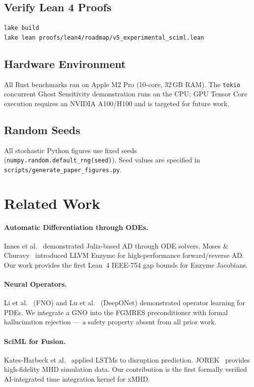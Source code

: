 \documentclass[11pt,twocolumn]{article}
\begin{document}
\subsection{Verify Lean 4 Proofs}
\begin{verbatim}
lake build
lake lean proofs/lean4/roadmap/v5_experimental_sciml.lean
\end{verbatim}

\subsection{Hardware Environment}
All Rust benchmarks ran on Apple M2 Pro (10-core, 32\,GB RAM).
The \texttt{tokio} concurrent Ghost Sensitivity demonstration runs
on the CPU; GPU Tensor Core execution requires an NVIDIA A100/H100
and is targeted for future work.

\subsection{Random Seeds}
All stochastic Python figures use fixed seeds (\texttt{numpy.random.default\_rng(seed)}).
Seed values are specified in \texttt{scripts/generate\_paper\_figures.py}.

\section{Related Work}

\paragraph{Automatic Differentiation through ODEs.}
Innes et al.~\cite{innes2019} demonstrated Julia-based AD through ODE
solvers. Moses \& Churavy~\cite{moses2021} introduced LLVM Enzyme for
high-performance forward/reverse AD. Our work provides the first
Lean~4 IEEE-754 gap bounds for Enzyme Jacobians.

\paragraph{Neural Operators.}
Li et al.~\cite{li2021} (FNO) and Lu et al.~\cite{lu2021} (DeepONet)
demonstrated operator learning for PDEs. We integrate a GNO into the
FGMRES preconditioner with formal hallucination rejection — a safety
property absent from all prior work.

\paragraph{SciML for Fusion.}
Kates-Harbeck et al.~\cite{kates2019} applied LSTMs to disruption
prediction. JOREK~\cite{hoelzl2021} provides high-fidelity MHD
simulation data. Our contribution is the first formally verified
AI-integrated time integration kernel for xMHD.
\end{document}
